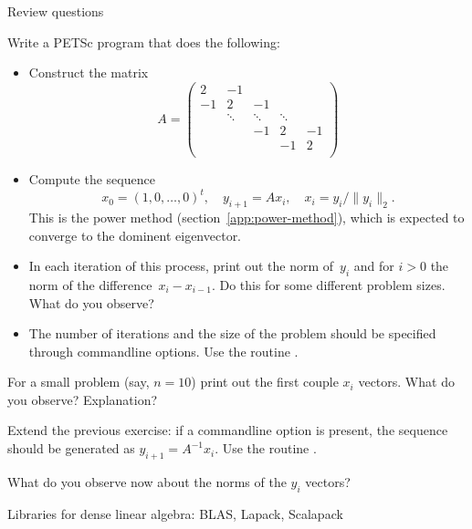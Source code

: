 \begin{istc}
 {Review questions}

\begin{exercise}
Write a PETSc program that does the following:
\begin{itemize}
\item Construct the matrix
  \[
  A=
  \begin{pmatrix}
    2&-1\\ -1&2&-1\\ &\ddots&\ddots&\ddots\\ &&-1&2&-1\\ &&&-1&2\\
  \end{pmatrix}
  \]
\item Compute the sequence
  \[ 
  x_0=(1,0,\ldots,0)^t,\quad y_{i+1}=Ax_i,\quad x_i=y_i/\|y_i\|_2.
  \]
  This is the power method (section~\ref{app:power-method}), which is
  expected to converge to the dominent eigenvector.
\item In each iteration of this process, print out the norm of~$y_i$
  and for $i>0$ the norm of the difference~$x_i-x_{i-1}$. Do this for
  some different problem sizes. What do you observe?
\item The number of iterations and the size of the problem should be
  specified through commandline options. Use the routine
  .
\end{itemize}
For a small problem (say, $n=10$) print out the first couple $x_i$
vectors. What do you observe? Explanation?
\end{exercise}

\end{istc}
\begin{istc}

\begin{exercise}
  Extend the previous exercise: if a commandline option 
  is present, the sequence should be generated as
  $y_{i+1}=A^{-1}x_i$. Use the routine .

  What do you observe now about the norms of the $y_i$ vectors?
\end{exercise}


\end{istc}


 {Libraries for dense linear algebra: BLAS, Lapack, Scalapack}




